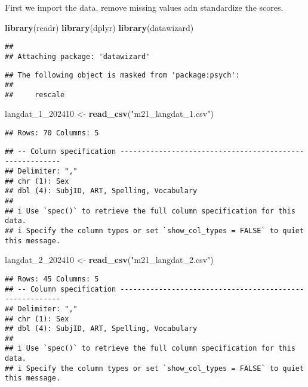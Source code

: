 \documentclass[
]{article}
\newenvironment{Shaded}{\begin{snugshade}}{\end{snugshade}}
\newcommand{\FunctionTok}[1]{\textcolor[rgb]{0.13,0.29,0.53}{\textbf{#1}}}
\newcommand{\NormalTok}[1]{#1}
\newcommand{\OtherTok}[1]{\textcolor[rgb]{0.56,0.35,0.01}{#1}}
\newcommand{\StringTok}[1]{\textcolor[rgb]{0.31,0.60,0.02}{#1}}
\begin{document}
First we import the data, remove missing values adn standardize the
scores.

\begin{Shaded}
\begin{Highlighting}[]
\FunctionTok{library}\NormalTok{(readr)}
\FunctionTok{library}\NormalTok{(dplyr)}
\FunctionTok{library}\NormalTok{(datawizard)}
\end{Highlighting}
\end{Shaded}

\begin{verbatim}
## 
## Attaching package: 'datawizard'
\end{verbatim}

\begin{verbatim}
## The following object is masked from 'package:psych':
## 
##     rescale
\end{verbatim}

\begin{Shaded}
\begin{Highlighting}[]
\NormalTok{langdat\_1\_202410 }\OtherTok{\textless{}{-}} \FunctionTok{read\_csv}\NormalTok{(}\StringTok{"m21\_langdat\_1.csv"}\NormalTok{)}
\end{Highlighting}
\end{Shaded}

\begin{verbatim}
## Rows: 70 Columns: 5
\end{verbatim}

\begin{verbatim}
## -- Column specification --------------------------------------------------------
## Delimiter: ","
## chr (1): Sex
## dbl (4): SubjID, ART, Spelling, Vocabulary
## 
## i Use `spec()` to retrieve the full column specification for this data.
## i Specify the column types or set `show_col_types = FALSE` to quiet this message.
\end{verbatim}

\begin{Shaded}
\begin{Highlighting}[]
\NormalTok{langdat\_2\_202410 }\OtherTok{\textless{}{-}} \FunctionTok{read\_csv}\NormalTok{(}\StringTok{"m21\_langdat\_2.csv"}\NormalTok{)}
\end{Highlighting}
\end{Shaded}

\begin{verbatim}
## Rows: 45 Columns: 5
## -- Column specification --------------------------------------------------------
## Delimiter: ","
## chr (1): Sex
## dbl (4): SubjID, ART, Spelling, Vocabulary
## 
## i Use `spec()` to retrieve the full column specification for this data.
## i Specify the column types or set `show_col_types = FALSE` to quiet this message.
\end{verbatim}
\end{document}
